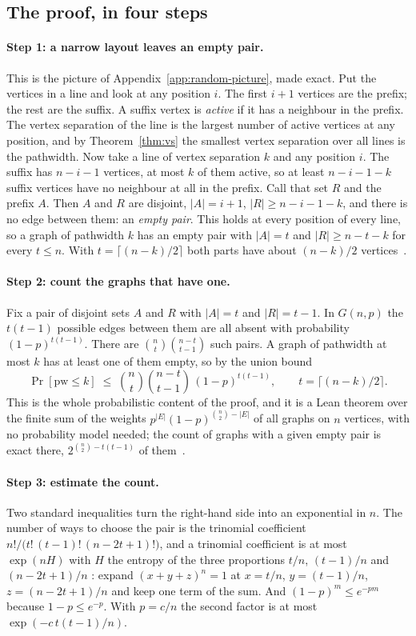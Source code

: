\subsection{The proof, in four steps}

\paragraph{Step 1: a narrow layout leaves an empty pair.}
This is the picture of Appendix~\ref{app:random-picture}, made exact. Put the vertices in a line and look at any position $i$. The first $i+1$
vertices are the prefix; the rest are the suffix. A suffix vertex is
\emph{active} if it has a neighbour in the prefix. The vertex separation of
the line is the largest number of active vertices at any position, and by
Theorem~\ref{thm:vs} the smallest vertex separation over all lines is the
pathwidth. Now take a line of vertex separation $k$ and any position $i$. The
suffix has $n-i-1$ vertices, at most $k$ of them active, so at least $n-i-1-k$
suffix vertices have no neighbour at all in the prefix. Call that set $R$ and
the prefix $A$. Then $A$ and $R$ are disjoint, $|A|=i+1$, $|R|\ge n-i-1-k$, and
there is no edge between them: an \emph{empty pair}. This holds at every
position of every line, so a graph of pathwidth $k$ has an empty pair with
$|A|=t$ and $|R|\ge n-t-k$ for every $t\le n$. With $t=\lceil(n-k)/2\rceil$
both parts have about $(n-k)/2$ vertices~.

\paragraph{Step 2: count the graphs that have one.}
Fix a pair of disjoint sets $A$ and $R$ with $|A|=t$ and $|R|=t-1$. In
$G(n,p)$ the $t(t-1)$ possible edges between them are all absent with
probability $(1-p)^{t(t-1)}$. There are $\binom nt\binom{n-t}{t-1}$ such
pairs. A graph of pathwidth at most $k$ has at least one of them empty, so by
the union bound
\[
  \Pr[\mathrm{pw}\le k]\;\le\;\binom nt\binom{n-t}{t-1}\,(1-p)^{t(t-1)},
  \qquad t=\lceil(n-k)/2\rceil .
\]
This is the whole probabilistic content of the proof, and it is a Lean
theorem over the finite sum of the weights $p^{|E|}(1-p)^{\binom n2-|E|}$ of
all graphs on $n$ vertices, with no probability model needed; the count of
graphs with a given empty pair is exact there, $2^{\binom n2-t(t-1)}$ of
them~.

\paragraph{Step 3: estimate the count.}
Two standard inequalities turn the right-hand side into an exponential in
$n$. The number of ways to choose the pair is the trinomial coefficient
$n!/\bigl(t!\,(t-1)!\,(n-2t+1)!\bigr)$, and a trinomial coefficient is at most
$\exp(nH)$ with $H$ the entropy of the three proportions $t/n$, $(t-1)/n$ and
$(n-2t+1)/n$ \citep[Theorem~11.1.3]{CoverThomas2006}: expand
$(x+y+z)^{n}=1$ at $x=t/n$, $y=(t-1)/n$, $z=(n-2t+1)/n$ and keep one term of
the sum. And $(1-p)^{m}\le e^{-pm}$ because $1-p\le e^{-p}$. With $p=c/n$ the
second factor is at most $\exp(-c\,t(t-1)/n)$.

